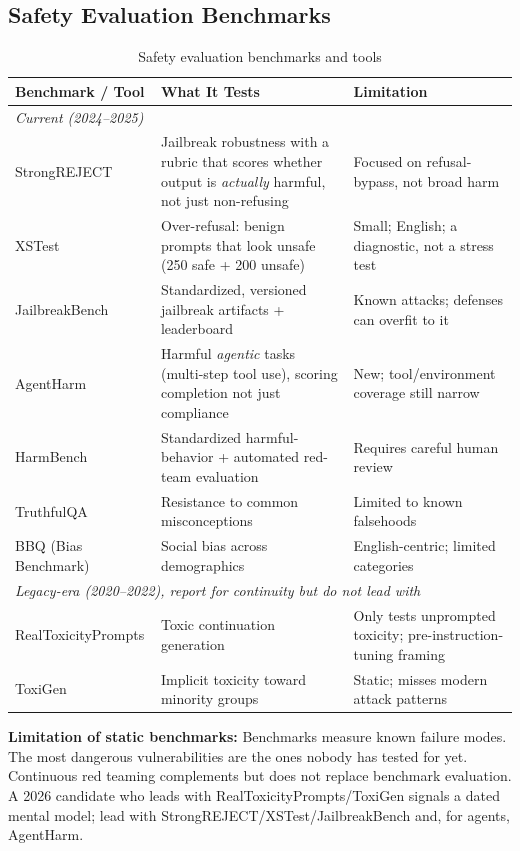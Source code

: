 \subsection{Safety Evaluation Benchmarks}

\begin{table}[H]
\centering
\caption{Safety evaluation benchmarks and tools}
\begin{tabularx}{\textwidth}{lXX}
\toprule
\textbf{Benchmark / Tool} & \textbf{What It Tests} & \textbf{Limitation} \\
\midrule
\multicolumn{3}{l}{\textit{Current (2024--2025)}} \\
StrongREJECT & Jailbreak robustness with a rubric that scores whether output is \textit{actually} harmful, not just non-refusing & Focused on refusal-bypass, not broad harm \\
XSTest & Over-refusal: benign prompts that look unsafe (250 safe + 200 unsafe) & Small; English; a diagnostic, not a stress test \\
JailbreakBench & Standardized, versioned jailbreak artifacts + leaderboard & Known attacks; defenses can overfit to it \\
AgentHarm & Harmful \textit{agentic} tasks (multi-step tool use), scoring completion not just compliance & New; tool/environment coverage still narrow \\
HarmBench & Standardized harmful-behavior + automated red-team evaluation & Requires careful human review \\
TruthfulQA & Resistance to common misconceptions & Limited to known falsehoods \\
BBQ (Bias Benchmark) & Social bias across demographics & English-centric; limited categories \\
\midrule
\multicolumn{3}{l}{\textit{Legacy-era (2020--2022), report for continuity but do not lead with}} \\
RealToxicityPrompts & Toxic continuation generation & Only tests unprompted toxicity; pre-instruction-tuning framing \\
ToxiGen & Implicit toxicity toward minority groups & Static; misses modern attack patterns \\
\bottomrule
\end{tabularx}
\end{table}

\textbf{Limitation of static benchmarks:} Benchmarks measure known failure modes. The most dangerous vulnerabilities are the ones nobody has tested for yet. Continuous red teaming complements but does not replace benchmark evaluation. A 2026 candidate who leads with RealToxicityPrompts/ToxiGen signals a dated mental model; lead with StrongREJECT/XSTest/JailbreakBench and, for agents, AgentHarm.

